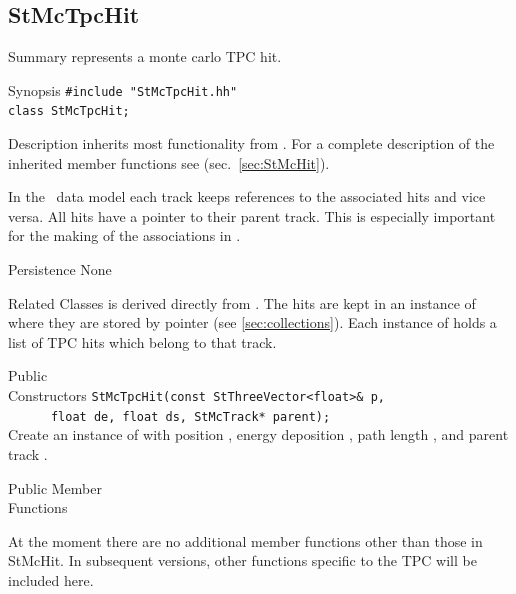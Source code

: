 \subsection{StMcTpcHit}
 
\label{sec:StMcTpcHit}
\begin{Entry}
\item[Summary]
     represents a monte carlo TPC hit.

\item[Synopsis]
    \verb+#include "StMcTpcHit.hh"+\\
    \verb+class StMcTpcHit;+\\

\item[Description]
     inherits most functionality from .
    For a complete description of the inherited member functions see
     (sec.~\ref{sec:StMcHit}).

    In the \StMcEvent\ data model each track keeps references to the
    associated hits and vice versa. All hits have a pointer to their
    parent track.  This is especially important for the making of the
    associations in \StAssociationMaker.

\item[Persistence]
    None

\item[Related Classes]
     is derived directly from .
    The hits are kept in an instance of 
    where they are stored by pointer (see \ref{sec:collections}).
    Each instance of  holds a list of TPC hits
    which belong to that track.

\item[Public\\ Constructors]
    \verb+StMcTpcHit(const StThreeVector<float>& p,+\\
    \verb+      float de, float ds, StMcTrack* parent);+\\
    
    Create an instance of  with position ,
    energy deposition , path length , and parent track .

\item[Public Member\\ Functions]

    At the moment there are no additional member functions other
    than those in StMcHit.  In subsequent versions, other functions
    specific to the TPC will be included here.


\end{Entry}
